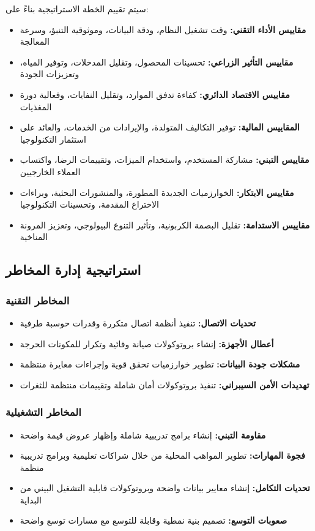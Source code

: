 سيتم تقييم الخطة الاستراتيجية بناءً على:

\begin{itemize}
    \item \textbf{مقاييس الأداء التقني:} وقت تشغيل النظام، ودقة البيانات، وموثوقية التنبؤ، وسرعة المعالجة
    \item \textbf{مقاييس التأثير الزراعي:} تحسينات المحصول، وتقليل المدخلات، وتوفير المياه، وتعزيزات الجودة
    \item \textbf{مقاييس الاقتصاد الدائري:} كفاءة تدفق الموارد، وتقليل النفايات، وفعالية دورة المغذيات
    \item \textbf{المقاييس المالية:} توفير التكاليف المتولدة، والإيرادات من الخدمات، والعائد على استثمار التكنولوجيا
    \item \textbf{مقاييس التبني:} مشاركة المستخدم، واستخدام الميزات، وتقييمات الرضا، واكتساب العملاء الخارجيين
    \item \textbf{مقاييس الابتكار:} الخوارزميات الجديدة المطورة، والمنشورات البحثية، وبراءات الاختراع المقدمة، وتحسينات التكنولوجيا
    \item \textbf{مقاييس الاستدامة:} تقليل البصمة الكربونية، وتأثير التنوع البيولوجي، وتعزيز المرونة المناخية
\end{itemize}

\subsection{استراتيجية إدارة المخاطر}

\subsubsection{المخاطر التقنية}
\begin{itemize}
    \item \textbf{تحديات الاتصال:} تنفيذ أنظمة اتصال متكررة وقدرات حوسبة طرفية
    \item \textbf{أعطال الأجهزة:} إنشاء بروتوكولات صيانة وقائية وتكرار للمكونات الحرجة
    \item \textbf{مشكلات جودة البيانات:} تطوير خوارزميات تحقق قوية وإجراءات معايرة منتظمة
    \item \textbf{تهديدات الأمن السيبراني:} تنفيذ بروتوكولات أمان شاملة وتقييمات منتظمة للثغرات
\end{itemize}

\subsubsection{المخاطر التشغيلية}
\begin{itemize}
    \item \textbf{مقاومة التبني:} إنشاء برامج تدريبية شاملة وإظهار عروض قيمة واضحة
    \item \textbf{فجوة المهارات:} تطوير المواهب المحلية من خلال شراكات تعليمية وبرامج تدريبية منظمة
    \item \textbf{تحديات التكامل:} إنشاء معايير بيانات واضحة وبروتوكولات قابلية التشغيل البيني من البداية
    \item \textbf{صعوبات التوسع:} تصميم بنية نمطية وقابلة للتوسع مع مسارات توسع واضحة
\end{itemize}

